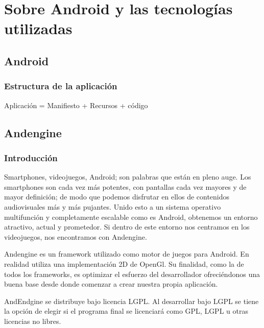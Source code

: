 \documentclass[12 pt, a4paper, twoside]{article}
\begin{document}


\newpage

\tableofcontents

\newpage

\section{Sobre Android y las tecnologías utilizadas}
\subsection{Android}
\subsubsection{Estructura de la aplicación}
Aplicación = Manifiesto + Recursos + código


\newpage
\subsection{Andengine}
\subsubsection{Introducción}
Smartphones, videojuegos, Android; son palabras que están en pleno
auge. Los smartphones son cada vez más potentes, con pantallas cada
vez mayores y de mayor definición; de modo que podemos disfrutar en
ellos de contenidos audiovisuales más y más pujantes. Unido esto a
un sistema operativo multifunción y completamente escalable como es
Android, obtenemos un entorno atractivo, actual y prometedor. Si
dentro de este entorno nos centramos en los videojuegos, nos
encontramos con Andengine.

Andengine es un framework utilizado como motor de juegos para Android. En
realidad utiliza una implementación 2D de OpenGl. Su
finalidad, como la de todos los frameworks, es optimizar el
esfuerzo del desarrollador ofreciéndonos una buena base desde donde
comenzar a crear nuestra propia aplicación.

AndEndgine se distribuye bajo licencia LGPL. Al desarrollar bajo LGPL se tiene la opción de elegir si el
programa final se licenciará como GPL, LGPL u otras licencias no
libres.
\end{document}
